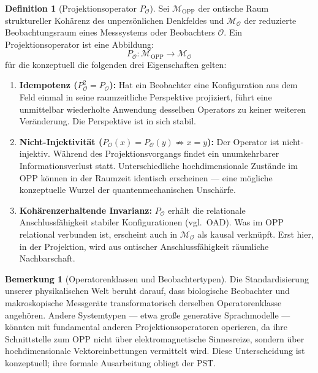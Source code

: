 \documentclass[11pt,a4paper]{article}
\theoremstyle{plain}
\theoremstyle{definition}
\newtheorem{definition}{Definition}[section]
\newtheorem{remark}{Bemerkung}[section]
\begin{document}
\begin{definition}[Projektionsoperator $P_{\mathcal{O}}$]
Sei $\mathcal{M}_{\text{OPP}}$ der ontische Raum struktureller Koh\"{a}renz des
unpers\"{o}nlichen Denkfeldes und $\mathcal{M}_{\mathcal{O}}$ der reduzierte
Beobachtungsraum eines Messsystems oder Beobachters $\mathcal{O}$. Ein
Projektionsoperator ist eine Abbildung:
\[
  P_{\mathcal{O}}\colon \mathcal{M}_{\text{OPP}} \longrightarrow \mathcal{M}_{\mathcal{O}}
\]
f\"{u}r die konzeptuell die folgenden drei Eigenschaften gelten:
\begin{enumerate}
  \item \textbf{Idempotenz ($P_{\mathcal{O}}^2 = P_{\mathcal{O}}$):} Hat ein Beobachter
        eine Konfiguration aus dem Feld einmal in seine raumzeitliche Perspektive
        projiziert, f\"{u}hrt eine unmittelbar wiederholte Anwendung desselben Operators
        zu keiner weiteren Ver\"{a}nderung. Die Perspektive ist in sich stabil.
  \item \textbf{Nicht-Injektivit\"{a}t ($P_{\mathcal{O}}(x) = P_{\mathcal{O}}(y)
        \not\Rightarrow x=y$):} Der Operator ist nicht-injektiv. W\"{a}hrend des
        Projektionsvorgangs findet ein unumkehrbarer Informationsverlust statt.
        Unterschiedliche hochdimensionale Zust\"{a}nde im OPP k\"{o}nnen in der Raumzeit
        identisch erscheinen --- eine m\"{o}gliche konzeptuelle Wurzel der
        quantenmechanischen Unsch\"{a}rfe.
  \item \textbf{Koh\"{a}renzerhaltende Invarianz:} $P_{\mathcal{O}}$ erh\"{a}lt die
        relationale Anschlussf\"{a}higkeit stabiler Konfigurationen (vgl.\ OAD). Was im
        OPP relational verbunden ist, erscheint auch in $\mathcal{M}_{\mathcal{O}}$ als
        kausal verkn\"{u}pft. Erst hier, in der Projektion, wird aus ontischer
        Anschlussf\"{a}higkeit r\"{a}umliche Nachbarschaft.
\end{enumerate}
\end{definition}

\begin{remark}[Operatorenklassen und Beobachtertypen]
Die Standardisierung unserer physikalischen Welt beruht darauf, dass biologische
Beobachter und makroskopische Messger\"{a}te transformatorisch derselben Operatorenklasse
angeh\"{o}ren. Andere Systemtypen --- etwa gro\ss{}e generative Sprachmodelle --- k\"{o}nnten
mit fundamental anderen Projektionsoperatoren operieren, da ihre Schnittstelle zum OPP
nicht \"{u}ber elektromagnetische Sinnesreize, sondern \"{u}ber hochdimensionale
Vektoreinbettungen vermittelt wird. Diese Unterscheidung ist konzeptuell; ihre formale
Ausarbeitung obliegt der PST.
\end{remark}
\end{document}
